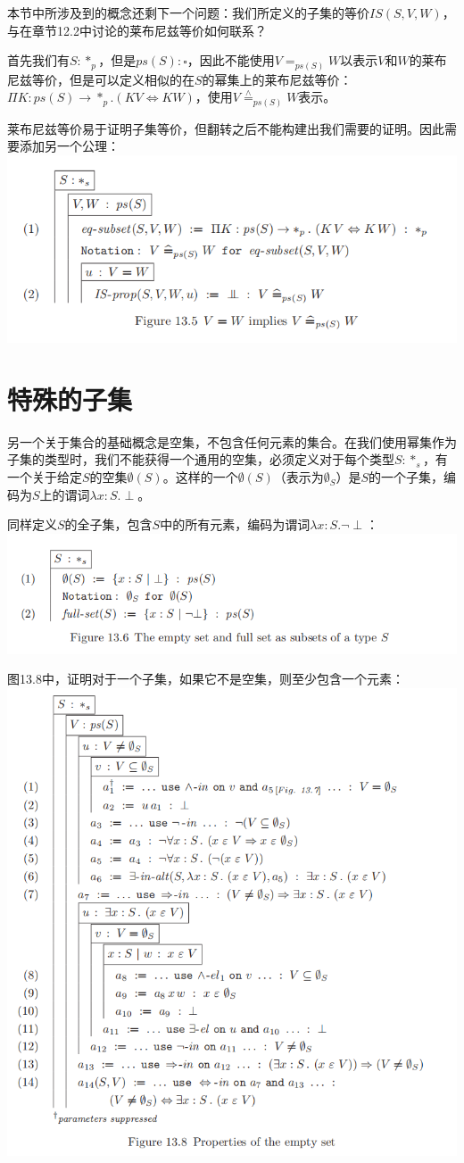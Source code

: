 \documentclass[UTF8]{article}
\begin{document}
		本节中所涉及到的概念还剩下一个问题：我们所定义的子集的等价$IS(S,V,W)$，与在章节12.2中讨论的莱布尼兹等价如何联系？
		
		首先我们有$S:*_p$，但是$ps(S):\square$，因此不能使用$V=_{ps(S)}W$以表示$V$和$W$的莱布尼兹等价，但是可以定义相似的在$S$的幂集上的莱布尼兹等价：$\Pi K:ps(S)\rightarrow*_p.(KV\Leftrightarrow KW)$，使用$V\stackrel{\wedge}{=}_{ps(S)}W$表示。
		
		莱布尼兹等价易于证明子集等价，但翻转之后不能构建出我们需要的证明。因此需要添加另一个公理：\\
		\includegraphics[width=0.93\linewidth]{"../imgs/13-5.png"}
		
	\section{特殊的子集}
	\noindent
	另一个关于集合的基础概念是空集，不包含任何元素的集合。在我们使用幂集作为子集的类型时，我们不能获得一个通用的空集，必须定义对于每个类型$S:*_s$，有一个关于给定$S$的空集$\emptyset(S)$。这样的一个$\emptyset(S)$（表示为$\emptyset_S$）是$S$的一个子集，编码为$S$上的谓词$\lambda x:S.\perp$。
	
		同样定义$S$的全子集，包含$S$中的所有元素，编码为谓词$\lambda x:S.\neg\perp$：\\
		\includegraphics[width=0.93\linewidth]{"../imgs/13-6.png"}
		
		图13.8中，证明对于一个子集，如果它不是空集，则至少包含一个元素：\\
		\includegraphics[width=0.93\linewidth]{"../imgs/13-7.png"}
\end{document}
